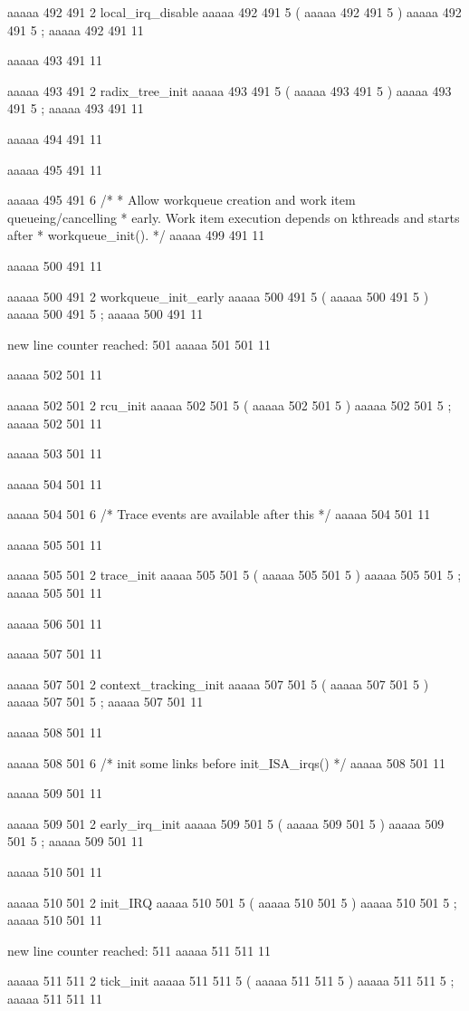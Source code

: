 {aaaaa 492 491
2
local_irq_disable
aaaaa 492 491
5
(
aaaaa 492 491
5
)
aaaaa 492 491
5
;
aaaaa 492 491
11


aaaaa 493 491
11
	
aaaaa 493 491
2
radix_tree_init
aaaaa 493 491
5
(
aaaaa 493 491
5
)
aaaaa 493 491
5
;
aaaaa 493 491
11


aaaaa 494 491
11


aaaaa 495 491
11
	
aaaaa 495 491
6
/*
	 * Allow workqueue creation and work item queueing/cancelling
	 * early.  Work item execution depends on kthreads and starts after
	 * workqueue_init().
	 */
aaaaa 499 491
11


aaaaa 500 491
11
	
aaaaa 500 491
2
workqueue_init_early
aaaaa 500 491
5
(
aaaaa 500 491
5
)
aaaaa 500 491
5
;
aaaaa 500 491
11


new line counter reached: 501
aaaaa 501 501
11


aaaaa 502 501
11
	
aaaaa 502 501
2
rcu_init
aaaaa 502 501
5
(
aaaaa 502 501
5
)
aaaaa 502 501
5
;
aaaaa 502 501
11


aaaaa 503 501
11


aaaaa 504 501
11
	
aaaaa 504 501
6
/* Trace events are available after this */
aaaaa 504 501
11


aaaaa 505 501
11
	
aaaaa 505 501
2
trace_init
aaaaa 505 501
5
(
aaaaa 505 501
5
)
aaaaa 505 501
5
;
aaaaa 505 501
11


aaaaa 506 501
11


aaaaa 507 501
11
	
aaaaa 507 501
2
context_tracking_init
aaaaa 507 501
5
(
aaaaa 507 501
5
)
aaaaa 507 501
5
;
aaaaa 507 501
11


aaaaa 508 501
11
	
aaaaa 508 501
6
/* init some links before init_ISA_irqs() */
aaaaa 508 501
11


aaaaa 509 501
11
	
aaaaa 509 501
2
early_irq_init
aaaaa 509 501
5
(
aaaaa 509 501
5
)
aaaaa 509 501
5
;
aaaaa 509 501
11


aaaaa 510 501
11
	
aaaaa 510 501
2
init_IRQ
aaaaa 510 501
5
(
aaaaa 510 501
5
)
aaaaa 510 501
5
;
aaaaa 510 501
11


new line counter reached: 511
aaaaa 511 511
11
	
aaaaa 511 511
2
tick_init
aaaaa 511 511
5
(
aaaaa 511 511
5
)
aaaaa 511 511
5
;
aaaaa 511 511
11


}
